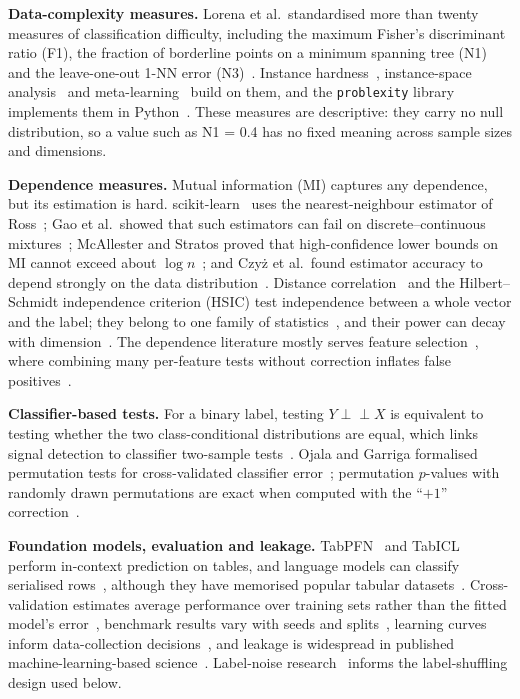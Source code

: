 \textbf{Data-complexity measures.} Lorena et al.\ standardised more than twenty measures of classification difficulty, including the maximum Fisher's discriminant ratio (F1), the fraction of borderline points on a minimum spanning tree (N1) and the leave-one-out 1-NN error (N3)~\cite{lorena2019}. Instance hardness~\cite{smith2014}, instance-space analysis~\cite{munoz2018} and meta-learning~\cite{rivolli2022} build on them, and the \texttt{problexity} library implements them in Python~\cite{komorniczak2022}. These measures are descriptive: they carry no null distribution, so a value such as N1 = 0.4 has no fixed meaning across sample sizes and dimensions.

\textbf{Dependence measures.} Mutual information (MI) captures any dependence, but its estimation is hard. scikit-learn~\cite{pedregosa2011} uses the nearest-neighbour estimator of Ross~\cite{ross2014}; Gao et al.\ showed that such estimators can fail on discrete--continuous mixtures~\cite{gao2017}; McAllester and Stratos proved that high-confidence lower bounds on MI cannot exceed about $\log n$~\cite{mcallester2020}; and Czy\.z et al.\ found estimator accuracy to depend strongly on the data distribution~\cite{czyz2023}. Distance correlation~\cite{szekely2013,ramoscarreno2023} and the Hilbert--Schmidt independence criterion (HSIC) test independence between a whole vector and the label; they belong to one family of statistics~\cite{sejdinovic2013}, and their power can decay with dimension~\cite{ramdas2015}. The dependence literature mostly serves feature selection~\cite{vergara2014,li2017}, where combining many per-feature tests without correction inflates false positives~\cite{korthauer2019}.

\textbf{Classifier-based tests.} For a binary label, testing $Y\perp\!\!\!\perp X$ is equivalent to testing whether the two class-conditional distributions are equal, which links signal detection to classifier two-sample tests~\cite{lopezpaz2017,kim2021}. Ojala and Garriga formalised permutation tests for cross-validated classifier error~\cite{ojala2010}; permutation $p$-values with randomly drawn permutations are exact when computed with the ``$+1$'' correction~\cite{hemerik2018,phipson2010}.

\textbf{Foundation models, evaluation and leakage.} TabPFN~\cite{hollmann2023,hollmann2025} and TabICL~\cite{qu2025} perform in-context prediction on tables, and language models can classify serialised rows~\cite{hegselmann2023}, although they have memorised popular tabular datasets~\cite{bordt2024}. Cross-validation estimates average performance over training sets rather than the fitted model's error~\cite{bates2024}, benchmark results vary with seeds and splits~\cite{bouthillier2021}, learning curves inform data-collection decisions~\cite{mohr2024,viering2023}, and leakage is widespread in published machine-learning-based science~\cite{kaufman2012,kapoor2023}. Label-noise research~\cite{frenay2014} informs the label-shuffling design used below.

